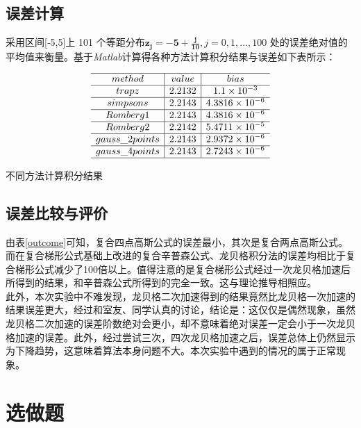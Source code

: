 \documentclass{ctexart}%
\begin{document}
\subsection{误差计算}
采用区间[‐5,5]上 101 个等距分布$\mathbf{z_j=-5+\frac{j}{10}},j=0,1,...,100$
处的误差绝对值的平均值来衡量。基于\textit{Matlab}计算得各种方法计算积分结果与误差如下表所示：

\begin{table}[H]
$$
\begin{array}{c|c|c}
\hline method & value  & bias \\
\hline trapz & 2.2132 & 1.1\times{10}^{-3} \\
\hline simpsons &  2.2143 & 4.3816\times{10}^{-6} \\
\hline Romberg1 & 2.2143 & 4.3816\times{10}^{-6} \\
\hline Romberg2 & 2.2142 & 5.4711\times{10}^{-5} \\
\hline gauss\_2points & 2.2143 & 2.9372\times{10}^{-6} \\
\hline gauss\_4points & 2.2143 & 2.7243\times{10}^{-6} \\
\hline
\end{array}
$$
\caption{不同方法计算积分结果}
\label{outcome}%
\end{table}

\subsection{误差比较与评价}
由表\ref{outcome}可知，复合四点高斯公式的误差最小，其次是复合两点高斯公式。而在复合梯形公式基础上改进的复合辛普森公式、龙贝格积分法的误差均相比于复合梯形公式减少了100倍以上。值得注意的是复合梯形公式经过一次龙贝格加速后所得到的结果，和辛普森公式所得到的完全一致。这与理论推导相照应。\\
此外，本次实验中不难发现，龙贝格二次加速得到的结果竟然比龙贝格一次加速的结果误差更大，经过和室友、同学认真的讨论，结论是：这仅仅是偶然现象，虽然龙贝格二次加速的误差阶数绝对会更小，却不意味着绝对误差一定会小于一次龙贝格加速的误差。此外，经过尝试三次，四次龙贝格加速之后，误差总体上仍然显示为下降趋势，这意味着算法本身问题不大。本次实验中遇到的情况的属于正常现象。




\section{选做题}
\end{document}
